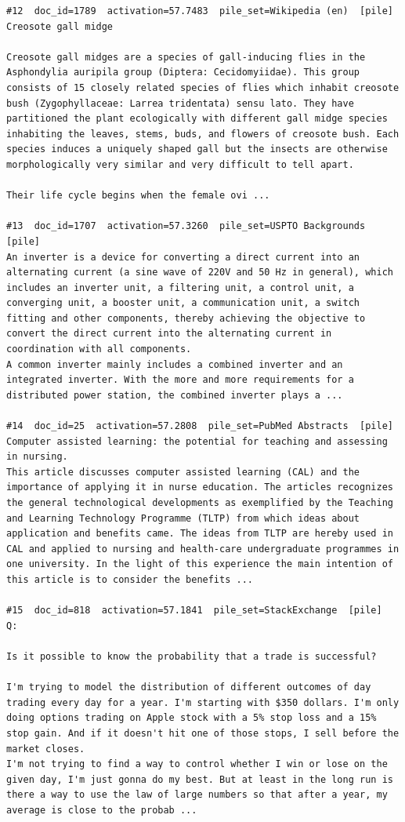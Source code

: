 \begin{verbatim}
#12  doc_id=1789  activation=57.7483  pile_set=Wikipedia (en)  [pile]
Creosote gall midge

Creosote gall midges are a species of gall-inducing flies in the Asphondylia auripila group (Diptera: Cecidomyiidae). This group consists of 15 closely related species of flies which inhabit creosote bush (Zygophyllaceae: Larrea tridentata) sensu lato. They have partitioned the plant ecologically with different gall midge species inhabiting the leaves, stems, buds, and flowers of creosote bush. Each species induces a uniquely shaped gall but the insects are otherwise morphologically very similar and very difficult to tell apart.

Their life cycle begins when the female ovi ...

#13  doc_id=1707  activation=57.3260  pile_set=USPTO Backgrounds  [pile]
An inverter is a device for converting a direct current into an alternating current (a sine wave of 220V and 50 Hz in general), which includes an inverter unit, a filtering unit, a control unit, a converging unit, a booster unit, a communication unit, a switch fitting and other components, thereby achieving the objective to convert the direct current into the alternating current in coordination with all components.
A common inverter mainly includes a combined inverter and an integrated inverter. With the more and more requirements for a distributed power station, the combined inverter plays a ...

#14  doc_id=25  activation=57.2808  pile_set=PubMed Abstracts  [pile]
Computer assisted learning: the potential for teaching and assessing in nursing.
This article discusses computer assisted learning (CAL) and the importance of applying it in nurse education. The articles recognizes the general technological developments as exemplified by the Teaching and Learning Technology Programme (TLTP) from which ideas about application and benefits came. The ideas from TLTP are hereby used in CAL and applied to nursing and health-care undergraduate programmes in one university. In the light of this experience the main intention of this article is to consider the benefits ...

#15  doc_id=818  activation=57.1841  pile_set=StackExchange  [pile]
Q:

Is it possible to know the probability that a trade is successful?

I'm trying to model the distribution of different outcomes of day trading every day for a year. I'm starting with $350 dollars. I'm only doing options trading on Apple stock with a 5% stop loss and a 15% stop gain. And if it doesn't hit one of those stops, I sell before the market closes.
I'm not trying to find a way to control whether I win or lose on the given day, I'm just gonna do my best. But at least in the long run is there a way to use the law of large numbers so that after a year, my average is close to the probab ...


\end{verbatim}
